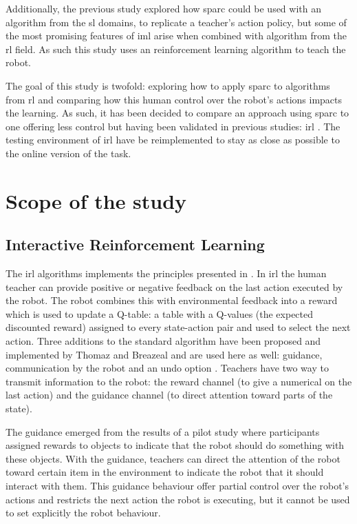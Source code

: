 Additionally, the previous study explored how \gls{sparc} could be used with an algorithm from the \gls{sl} domains, to replicate a teacher's action policy, but some of the most promising features of \gls{iml} arise when combined with algorithm from the \gls{rl} field. As such this study uses an reinforcement learning algorithm to teach the robot.

The goal of this study is twofold: exploring how to apply \gls{sparc} to algorithms from \gls{rl} and comparing how this human control over the robot's actions impacts the learning. As such, it has been decided to compare an approach using \gls{sparc} to one offering less control but having been validated in previous studies: \acrfull{irl} \citep{thomaz2008teachable}. The testing environment of \gls{irl} have be reimplemented to stay as close as possible to the online version of the task.

\section{Scope of the study}

\subsection{Interactive Reinforcement Learning}

The \gls{irl} algorithms implements the principles presented in \cite{thomaz2008teachable}. In \gls{irl} the human teacher can provide positive or negative feedback on the last action executed by the robot. The robot combines this with environmental feedback into a reward which is used to update a Q-table: a table with a Q-values (the expected discounted reward) assigned to every state-action pair and used to select the next action. Three additions to the standard algorithm have been proposed and implemented by Thomaz and Breazeal and are used here as well: guidance, communication by the robot and an undo option \citep{thomaz2008teachable}. Teachers have two way to transmit information to the robot: the reward channel (to give a numerical on the last action) and the guidance channel (to direct attention toward parts of the state).

The guidance emerged from the results of a pilot study where participants assigned rewards to objects to indicate that the robot should do something with these objects. With the guidance, teachers can direct the attention of the robot toward certain item in the environment to indicate the robot that it should interact with them. This guidance behaviour offer partial control over the robot's actions and restricts the next action the robot is executing, but it cannot be used to set explicitly the robot behaviour. 

